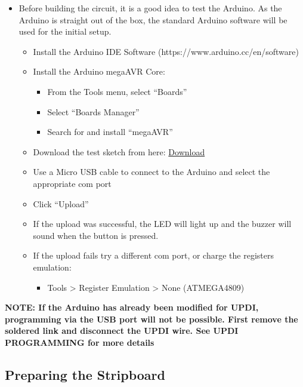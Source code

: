 \documentclass[
  letterpaper,
]{scrbook}
\providecommand{\tightlist}{%
  \setlength{\itemsep}{0pt}\setlength{\parskip}{0pt}}
\begin{document}
\begin{itemize}
\item
  Before building the circuit, it is a good idea to test the Arduino. As
  the Arduino is straight out of the box, the standard Arduino software
  will be used for the initial setup.

  \begin{itemize}
  \item
    Install the Arduino IDE Software
    (https://www.arduino.cc/en/software)
  \item
    Install the Arduino megaAVR Core:

    \begin{itemize}
    \item
      From the Tools menu, select ``Boards''
    \item
      Select ``Boards Manager''
    \item
      Search for and install ``megaAVR''
    \end{itemize}
  \item
    Download the test sketch from here:
    \href{files/monitor_test_sketch.ino}{Download}
  \item
    Use a Micro USB cable to connect to the Arduino and select the
    appropriate com port
  \item
    Click ``Upload''
  \item
    If the upload was successful, the LED will light up and the buzzer
    will sound when the button is pressed.
  \item
    If the upload fails try a different com port, or charge the
    registers emulation:

    \begin{itemize}
    \tightlist
    \item
      Tools \textgreater{} Register Emulation \textgreater{} None
      (ATMEGA4809)
    \end{itemize}
  \end{itemize}
\end{itemize}

\textbf{NOTE: If the Arduino has already been modified for UPDI,
programming via the USB port will not be possible. First remove the
soldered link and disconnect the UPDI wire. See UPDI PROGRAMMING for
more details}

\subsection{Preparing the Stripboard}\label{preparing-the-stripboard}
\end{document}
